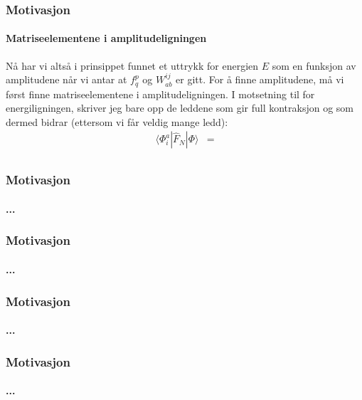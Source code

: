 \documentclass[norsk,a4paper,12pt]{beamer}
\begin{document}
  \begin{frame}
    \frametitle{Motivasjon}
    \framesubtitle{Matriseelementene i amplitudeligningen}
    Nå har vi altså i prinsippet funnet et uttrykk for energien $E$ som en funksjon av amplitudene når vi antar at $f_q^p$ og $W_{ab}^{ij}$ er gitt. For å finne amplitudene, må vi først finne matriseelementene i amplitudeligningen. I motsetning til for energiligningen, skriver jeg bare opp de leddene som gir full kontraksjon og som dermed bidrar (ettersom vi får veldig mange ledd):
    \begin{align*}
    \langle\Phi_i^a|\hat{F}_N|\Phi\rangle&=\\
    \end{align*}
  \end{frame}
  \begin{frame}
    \frametitle{Motivasjon}
    \framesubtitle{...}
    
  \end{frame}
  \begin{frame}
    \frametitle{Motivasjon}
    \framesubtitle{...}
    
  \end{frame}
  \begin{frame}
    \frametitle{Motivasjon}
    \framesubtitle{...}
    
  \end{frame}
  \begin{frame}
    \frametitle{Motivasjon}
    \framesubtitle{...}
    
  \end{frame}
  
  
\end{document}
